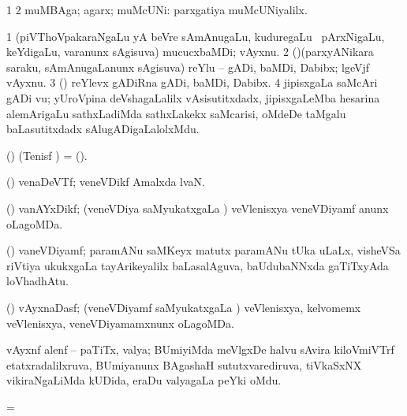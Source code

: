 \bentry
{} 
\gl{\nA}
\expl{}
\bmng
\bnum
\num{1}  
\num{2} muMBAga; agarx; muMcUNi:  parxgatiya muMcUNiyalilx. 
\enum
\emng
\eentry

\bentry
{} 
\gl{\nA}
\expl{}
\bmng
\bnum
\num{1} (piVThoVpakaraNgaLu yA beVre sAmAnugaLu, kuduregaLu \mo\ pArxNigaLu, keYdigaLu, \mo varanunx sAgisuva) mucucxbaMDi; vAyxnu. 
\num{2} (\birx)(parxyANikara saraku, sAmAnugaLanunx sAgisuva) reYlu -- gADi, baMDi, Dabibx; lgeVjf vAyxnu. 
\num{3} (\birx) reYlevx gADiRna gADi, baMDi, Dabibx. 
\num{4} jipisxgaLa saMcAri gADi \mo vu; yUroVpina deVshagaLalilx vAsisutitxdadx, jipisxgaLeMba hesarina alemArigaLu sathxLadiMda sathxLakekx saMcarisi, oMdeDe taMgalu baLasutitxdadx sAlugADigaLalolxMdu. 
\enum
\emng
\eentry

\bentry
{} 
\gl{\nA}
\expl{}
\bmng
 (\birx) (Tenisf \AmA) = (\saMkiSx). 
\emng
\eentry

\bentry
{} 
\gl{\nA}
\expl{}
\bmng
 (\ravi) venaDeVTf; veneVDikf Amalxda lvaN. 
\emng
\eentry

\bentry
{} 
\gl{\gu}
\expl{}
\bmng
 (\ravi) vanAYxDikf; (veneVDiya saMyukatxgaLa \vi)  veVlenisxya veneVDiyamf anunx oLagoMDa. 
\emng
\eentry

\bentry
{} 
\gl{\nA}
\expl{}
\bmng
 (\ravi) vaneVDiyamf; paramANu saMKeyx  matutx paramANu tUka uLaLx, visheVSa riVtiya ukukxgaLa tayArikeyalilx baLasalAguva, baUdubaNNxda gaTiTxyAda loVhadhAtu. 
\emng
\eentry

\bentry
{} 
\gl{\gu}
\expl{}
\bmng
 (\ravi) vAyxnaDasf; (veneVDiyamf saMyukatxgaLa \vi)  veVlenisxya, kelvomemx  veVlenisxya, veneVDiyamamxnunx oLagoMDa. 
\emng
\eentry

\bentry
{}
\gl{\nA}
\expl{}
\bmng
 vAyxnf alenf -- paTiTx, valya; BUmiyiMda meVlgxDe halvu sAvira kiloVmiVTrf etatxradalilxruva, BUmiyanunx BAgashaH sututxvarediruva, tiVkaSxNX vikiraNgaLiMda kUDida, eraDu valyagaLa peYki oMdu. 
\emng
\eentry

\bentry
{}
\gl{\nA}
\expl{}
\bmng
 =  
\emng
\eentry

